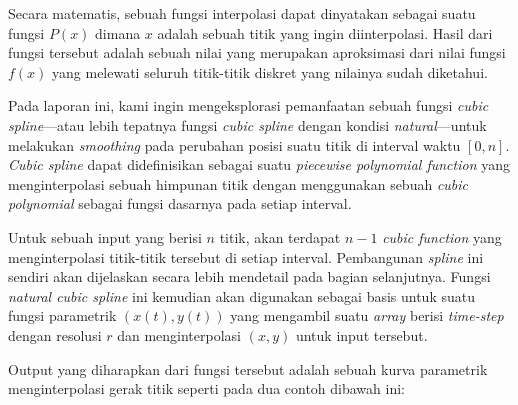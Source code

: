 \documentclass[journal,12pt,onecolumn,a4paper]{IEEEtran}
\begin{document}
Secara matematis, sebuah fungsi interpolasi dapat dinyatakan sebagai suatu fungsi \(P(x)\) dimana \(x\) adalah sebuah titik yang ingin diinterpolasi. Hasil dari fungsi tersebut adalah sebuah nilai yang merupakan aproksimasi dari nilai fungsi \(f(x)\) yang melewati seluruh titik-titik diskret yang nilainya sudah diketahui.

Pada laporan ini, kami ingin mengeksplorasi pemanfaatan sebuah fungsi \emph{cubic spline}---atau lebih tepatnya fungsi \emph{cubic spline} dengan kondisi \emph{natural}---untuk melakukan \emph{smoothing} pada perubahan posisi suatu titik di interval waktu \([0, n]\). \emph{Cubic spline} dapat didefinisikan sebagai suatu \emph{piecewise polynomial function} yang menginterpolasi sebuah himpunan titik dengan menggunakan sebuah \emph{cubic polynomial} sebagai fungsi dasarnya pada setiap interval.

Untuk sebuah input yang berisi \(n\) titik, akan terdapat \(n-1\) \emph{cubic function} yang menginterpolasi titik-titik tersebut di setiap interval. Pembangunan \emph{spline} ini sendiri akan dijelaskan secara lebih mendetail pada bagian selanjutnya. Fungsi \emph{natural cubic spline} ini kemudian akan digunakan sebagai basis untuk suatu fungsi parametrik \((x(t), y(t))\) yang mengambil suatu \emph{array} berisi \emph{time-step} dengan resolusi \(r\) dan menginterpolasi \((x, y)\) untuk input tersebut.

Output yang diharapkan dari fungsi tersebut adalah sebuah kurva parametrik  menginterpolasi gerak titik seperti pada dua contoh dibawah ini:
\end{document}
